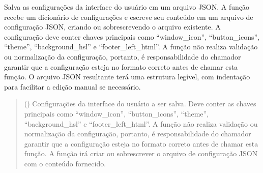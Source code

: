 \documentclass[letterpaper,10pt,english]{sphinxmanual}
\begin{document}
\begin{fulllineitems}
\label{\detokenize{api/config:config.save_ui_config}}
\pysigstartsignatures
\pysiglinewithargsret
{}
{}
{}
\pysigstopsignatures
\sphinxAtStartPar
Salva as configurações da interface do usuário em um arquivo JSON. A função recebe um dicionário de configurações e escreve seu conteúdo em um arquivo de configuração JSON, criando ou sobrescrevendo o arquivo existente. A configuração deve conter chaves principais como “window\_icon”, “button\_icons”, “theme”, “background\_hsl” e “footer\_left\_html”. A função não realiza validação ou normalização da configuração, portanto, é responsabilidade do chamador garantir que a configuração esteja no formato correto antes de chamar esta função. O arquivo JSON resultante terá uma estrutura legível, com indentação para facilitar a edição manual se necessário.
\begin{quote}\begin{description}
\sphinxAtStartPar
{} () \textendash{} Configurações da interface do usuário a ser salva. Deve conter as chaves principais como “window\_icon”, “button\_icons”, “theme”, “background\_hsl” e “footer\_left\_html”. A função não realiza validação ou normalização da configuração, portanto, é responsabilidade do chamador garantir que a configuração esteja no formato correto antes de chamar esta função. A função irá criar ou sobrescrever o arquivo de configuração JSON com o conteúdo fornecido.

\sphinxAtStartPar
{}

\end{description}\end{quote}

\end{fulllineitems}

\end{document}
